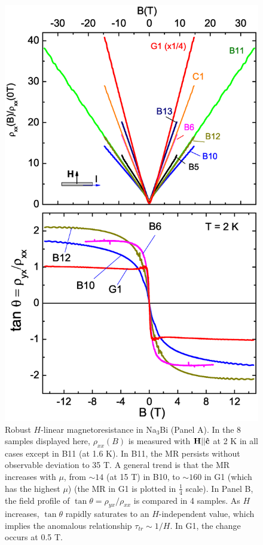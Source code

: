 \begin{figure}[!htbp]
  \begin{center}
\includegraphics[width=0.9\linewidth]{ch-na3bi/figures/FigMRHallAngle}
\caption{\label{figMRtan}
Robust $H$-linear magnetoresistance in Na$_3$Bi (Panel A). In the 8 samples displayed here, $\rho_{xx}(B)$ is measured with $\bf H||\hat{c}$ at 2 K in all cases except in B11 (at 1.6 K). In B11, the MR persists without observable deviation to 35 T. A general trend is that the MR increases with $\mu$, from $\sim 14$ (at 15 T) in B10, to $\sim 160$ in G1 (which has the highest $\mu$) (the MR in G1 is plotted in $\frac14$ scale). In Panel B, the field profile of $\tan\theta = \rho_{yx}/\rho_{xx}$ is compared in 4 samples. As $H$ increases, $\tan\theta$ rapidly saturates to an $H$-independent value, which implies the anomalous relationship $\tau_{tr}\sim 1/H$. In G1, the change occurs at 0.5 T.}
  \end{center}
\end{figure}

